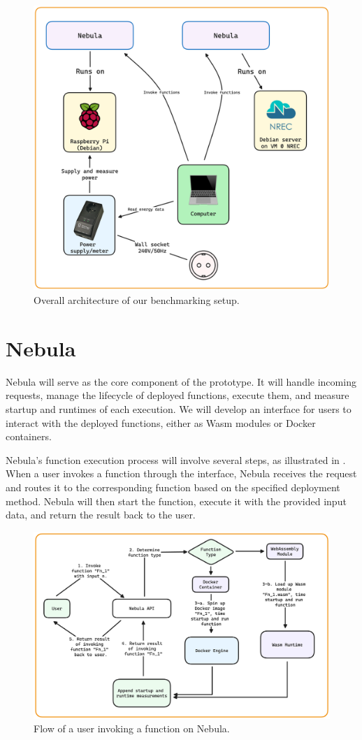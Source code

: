 \documentclass[
  table]{report}
\begin{document}
\begin{figure}[H]
\centering
  \includegraphics[width=0.7\columnwidth]{assets/5-overall-system-design.png}
  \caption{Overall architecture of our benchmarking setup.}
  \label{fig:system-design}
\end{figure}

\section{Nebula}

Nebula will serve as the core component of the prototype. It will handle
incoming requests, manage the lifecycle of deployed functions, execute
them, and measure startup and runtimes of each execution. We will
develop an interface for users to interact with the deployed functions,
either as \ac{Wasm} modules or Docker containers.

Nebula's function execution process will involve several steps, as
illustrated in . When a user invokes
a function through the interface, Nebula receives the request and routes
it to the corresponding function based on the specified deployment
method. Nebula will then start the function, execute it with the
provided input data, and return the result back to the user.

\begin{figure}[H]
\centering
  \includegraphics{assets/5-nebula-function-execution.png}
  \caption{Flow of a user invoking a function on Nebula.}
  \label{fig:function-execution-design}
\end{figure}
\end{document}
